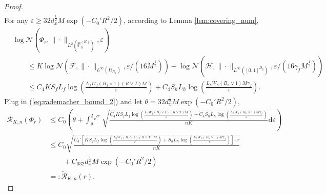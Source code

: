 \documentclass{article}
\numberwithin{equation}{section}
\def\eqref#1{equation~\ref{#1}}
\newcommand{\dif}{\mathrm{d}}
\theoremstyle{definition}
\renewcommand{\P}{\mathbb{P}}
\renewcommand{\eqref}[1]{(\ref{#1})}
\begin{document}
\begin{proof}
\begin{equation}
\begin{aligned}
        \end{aligned}
    \end{equation}
    For any $\varepsilon\geq 32d_x^{\frac{1}{2}}M\exp(-C_0'R^2/2)$, according to Lemma \ref{lem:covering_num},
    \begin{equation}
        \begin{aligned}
            &\log\mathcal{N}(\Phi_r,\|\cdot\|_{L^2(\widehat{\P}_n^{(K)})},\varepsilon) \\
            &\qquad \leq K\log\mathcal{N}(\mathcal{F},\|\cdot\|_{L^\infty(\Omega_{R_1})},\varepsilon/(16M^{\frac{1}{2}})) + \log\mathcal{N}(\mathcal{H},\|\cdot\|_{L^\infty([0,1]^{D_y})},\varepsilon/(16\gamma_fM^{\frac{1}{2}})) \\
            &\qquad \leq C_4KS_fL_f\log\left(\frac{L_fW_f(B_f\vee 1)(R\vee T)M}{\varepsilon}\right)+C_4S_hL_h\log\left(\frac{L_hW_h(B_h\vee 1)M\gamma_f}{\varepsilon}\right).
        \end{aligned}
    \end{equation}
    Plug in \eqref{eq:rademacher_bound_2} and let $\theta=32d_x^{\frac{1}{2}}M\exp(-C_0'R^2/2)$,
    \begin{equation}
        \begin{aligned}
            \mathcal{R}_{K,n}(\Phi_r)
            &\leq C_0\left(\theta+\int_\theta^{2\sqrt{r}}\sqrt{\frac{C_4KS_fL_f\log\left(\frac{L_fW_f(B_f\vee 1)(R\vee T)M}{\varepsilon}\right)+C_4S_hL_h\log\left(\frac{L_hW_h(B_h\vee 1)M\gamma_f}{\varepsilon}\right)}{nK}}\dif\varepsilon\right) \\
            &\leq C_0\sqrt{\frac{C_4'\left[KS_fL_f\log\left(\frac{L_fW_f(B_f\vee 1)(R\vee T)M}{r}\right)+ S_hL_h\log\left(\frac{L_hW_h(B_h\vee 1)M\gamma_f}{r}\right)\right]\cdot r}{nK}} \\
            &\qquad + C_032d_x^{\frac{1}{2}}M\exp(-C_0'R^2/2) \\
            &=: \widetilde{\mathcal{R}}_{K,n}(r).
        \end{aligned}
    \end{equation}


\end{proof}
\end{document}
